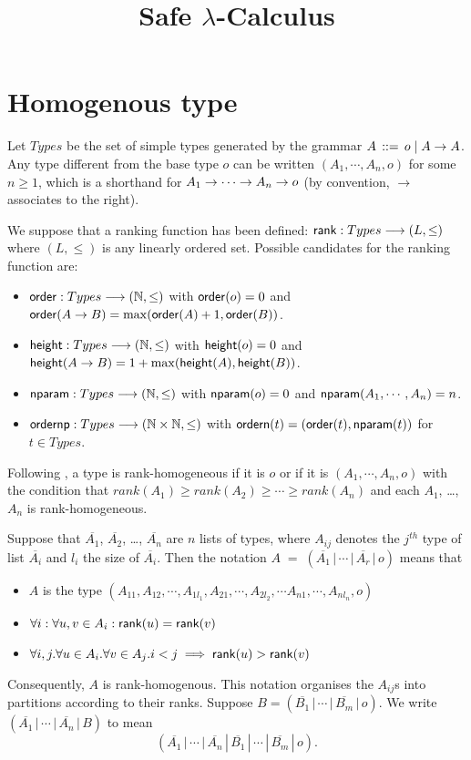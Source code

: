 \documentclass{article}
\title{Safe $\lambda$-Calculus}
\def\funto{\longrightarrow}
\newcommand\rank[1]{{\sf rank}(#1)}
\newcommand\order[1]{{\sf order}(#1)}
\newcommand\height[1]{{\sf height}(#1)}
\newcommand\nparam[1]{{\sf nparam}(#1)}
\def\nat{\mathbb{N}}
\begin{document}
\maketitle

\section{Homogenous type}

Let $Types$ be the set of simple types generated by the grammar $A
\, ::= \, o \; | \; A \rightarrow A$. Any type different from the base
type $o$ can be written $(A_1, \cdots, A_n, o)$ for some $n \geq 1$,
which is a shorthand for $A_1 \rightarrow \cdots \rightarrow A_n \rightarrow o$ (by
convention, $\rightarrow$ associates to the right).

We suppose that a ranking function has been defined: ${\sf rank} :
Types \funto (L, \leq)$ where $(L, \leq)$ is any linearly ordered
set. Possible candidates for the ranking function are:
\begin{itemize}
\item ${\sf order} : Types \funto (\nat,\leq)$ with $\order{o} = 0$
and $\order{A \funsp B} = \max(\order{A}+1, \order{B})$.
\item ${\sf height} : Types \funto (\nat,\leq)$ with $\height{o} = 0$
and $\height{A \funsp B} = 1 + \max(\height{A}, \height{B})$.
\item ${\sf nparam} : Types \funto (\nat,\leq)$ with $\nparam{o} = 0$
and $\nparam{A_1, \cdots, A_n} = n$.
\item ${\sf ordernp} : Types \funto (\nat \times \nat,\leq)$ with $ {\sf ordern} (t)  = (\order{t}, \nparam{t})$ for $t \in Types$.
\end{itemize}


Following \cite{KNU02}, a type is rank-homogeneous if it is $o$ or
if it is $(A_1, \cdots, A_n, o)$ with the condition that $rank(A_1)
\geq rank(A_2)\geq \cdots \geq rank(A_n)$ and each $A_1$, \ldots,
$A_n$ is rank-homogeneous.



Suppose that $\overline{A_1}$, $\overline{A_2}$, \ldots,
$\overline{A_n}$ are $n$ lists of types, where $A_{ij}$ denotes the
$j^{th}$ type of list $\overline{A_i}$ and $l_i$ the size of
$\overline{A_i}$. Then the notation $A \; = \; (\overline{A_1} \, |
\, \cdots \, | \, \overline{A_r} \, | \, o)$ means that
\begin{itemize}
  \item $A$ is the type $(A_{11},A_{12},\cdots, A_{1l_1}, A_{21}, \cdots,A_{2l_2}, \cdots A_{n1},\cdots, A_{nl_n},o)$
  \item $\forall i: \forall u,v \in A_i : \rank u = \rank v $
  \item $\forall i,j . \forall u \in A_i . \forall v \in A_j . i<j \implies \rank u >
   \rank v $
\end{itemize}
Consequently, $A$ is rank-homogenous. This notation organises the
$A_{ij}$s into partitions according to their ranks. Suppose $B =
(\overline{B_1} \, | \, \cdots \, | \, \overline{B_m} \, | \, o)$.
We write $(\overline{A_1} \, | \, \cdots \, | \, \overline{A_n} \, |
\, {B})$ to mean
\[(\overline{A_1} \, | \, \cdots \, | \, \overline{A_n} \, | \,
\overline{B_1} \, | \, \cdots \, | \, \overline{B_m} \, | \, o).\]
\end{document}
